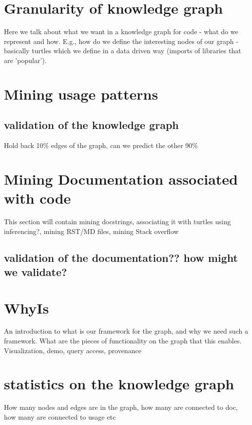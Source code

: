 \section{Granularity of knowledge graph}
Here we talk about what we want in a knowledge graph for code - what do we represent and how.  E.g., how do we define the interesting nodes of our graph - basically turtles which we define in a data driven way (imports of libraries that are 'popular').
\section{Mining usage patterns}


\subsection{validation of the knowledge graph}
Hold back 10\% edges of the graph, can we predict the other 90\%
\section{Mining Documentation associated with code}
This section will contain mining docstrings, associating it with turtles using inferencing?, mining RST/MD files, mining Stack overflow
\subsection{validation of the documentation?? how might we validate?}
\section{WhyIs} An introduction to what is our framework for the graph, and why we need such a framework.  What are the pieces of functionality on the graph that this enables. Visualization, demo, query access, provenance 
\section{statistics on the knowledge graph}
How many nodes and edges are in the graph, how many are connected to doc, how many are connected to usage etc
